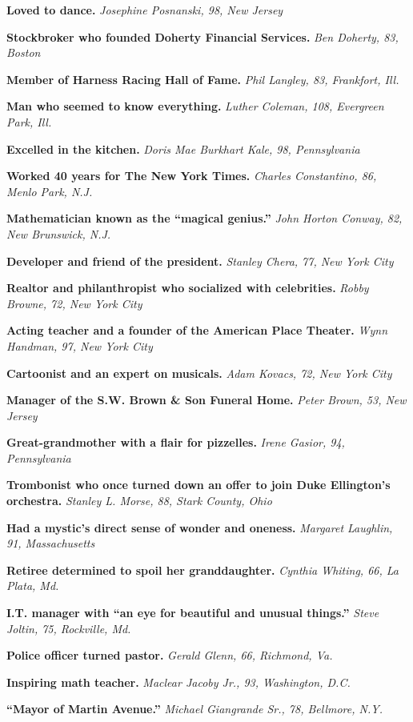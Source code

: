 \textbf{Loved to dance.} \emph{Josephine Posnanski, 98, New Jersey}

\textbf{Stockbroker who founded Doherty Financial Services.} \emph{Ben
Doherty, 83, Boston}

\textbf{Member of Harness Racing Hall of Fame.} \emph{Phil Langley, 83,
Frankfort, Ill.}

\textbf{Man who seemed to know everything.} \emph{Luther Coleman, 108,
Evergreen Park, Ill.}

\textbf{Excelled in the kitchen.} \emph{Doris Mae Burkhart Kale, 98,
Pennsylvania}

\textbf{Worked 40 years for The New York Times.} \emph{Charles
Constantino, 86, Menlo Park, N.J.}

\textbf{Mathematician known as the ``magical genius.''} \emph{John
Horton Conway, 82, New Brunswick, N.J.}

\textbf{Developer and friend of the president.} \emph{Stanley Chera, 77,
New York City}

\textbf{Realtor and philanthropist who socialized with celebrities.}
\emph{Robby Browne, 72, New York City}

\textbf{Acting teacher and a founder of the American Place Theater.}
\emph{Wynn Handman, 97, New York City}

\textbf{Cartoonist and an expert on musicals.} \emph{Adam Kovacs, 72,
New York City}

\textbf{Manager of the S.W. Brown \& Son Funeral Home.} \emph{Peter
Brown, 53, New Jersey}

\textbf{Great-grandmother with a flair for pizzelles.} \emph{Irene
Gasior, 94, Pennsylvania}

\textbf{Trombonist who once turned down an offer to join Duke
Ellington's orchestra.} \emph{Stanley L. Morse, 88, Stark County, Ohio}

\textbf{Had a mystic's direct sense of wonder and oneness.}
\emph{Margaret Laughlin, 91, Massachusetts}

\textbf{Retiree determined to spoil her granddaughter.} \emph{Cynthia
Whiting, 66, La Plata, Md.}

\textbf{I.T. manager with ``an eye for beautiful and unusual things.''}
\emph{Steve Joltin, 75, Rockville, Md.}

\textbf{Police officer turned pastor.} \emph{Gerald Glenn, 66, Richmond,
Va.}

\textbf{Inspiring math teacher.} \emph{Maclear Jacoby Jr., 93,
Washington, D.C.}

\textbf{``Mayor of Martin Avenue.''} \emph{Michael Giangrande Sr., 78,
Bellmore, N.Y.}

